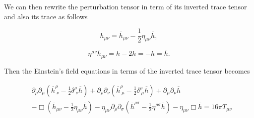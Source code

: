         We can then rewrite the perturbation tensor in term of its inverted trace tensor and also its trace as follows

        \begin{equation}
            h_{\mu\nu} = \overline{h}_{\mu\nu} - \frac{1}{2}\eta_{\mu\nu}\overline{h},
        \end{equation}

        \begin{equation}
            \eta^{\mu\nu}\overline{h}_{\mu\nu} = h - 2h = -h = \overline{h}.
        \end{equation}

        Then the Einstein's field equations in terms of the inverted trace tensor becomes

        \begin{align*}
            &\partial_{\rho}\partial_{\mu}\left(\overline{h}^{\rho}_{\;\nu} - \frac{1}{2}\delta^{\rho}_{\;\nu}\overline{h} \right) + \partial_{\rho}\partial_{\nu}\left(\overline{h}^{\rho}_{\;\mu} - \frac{1}{2}\delta^{\rho}_{\;\mu}\overline{h} \right) + \partial_{\mu}\partial_{\nu}\overline{h}\\
            &-\Box\left(\overline{h}_{\mu\nu} - \frac{1}{2}\eta_{\mu\nu}\overline{h} \right) - \eta_{\mu\nu}\partial_{\rho}\partial_{\sigma}\left(\overline{h}^{\rho\sigma}-\frac{1}{2}\eta^{\rho\sigma}\overline{h} \right) - \eta_{\mu\nu}\Box\overline{h} = 16\pi T_{\mu\nu}
        \end{align*}

